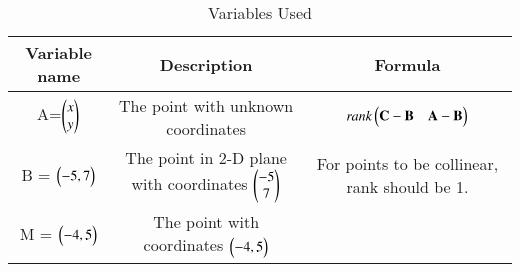 \begin{table}[!ht]
	\centering
	\setlength{\extrarowheight}{8pt}
	\begin{tabular}{|c|c|c|}
    \hline
    \textbf{Variable name} & \textbf{Description} & \textbf{Formula}\\ 
    \hline
		A=$\begin{pmatrix}x\\ y\end{pmatrix}$ & The point with unknown coordinates & $\emph{rank}\begin{pmatrix} \mathbf{C}-\mathbf{B} & \mathbf{A} - \mathbf{B} \end{pmatrix}$ \\
    \hline 
		B = $\begin{pmatrix}-5,7\end{pmatrix}$ & The point in 2-D plane with coordinates $\begin{pmatrix}-5 \\ 7\end{pmatrix}$ & For points to be collinear, rank should be 1. \\
    \hline
		M = $\begin{pmatrix}-4,5\end{pmatrix}$ & The point with coordinates $\begin{pmatrix}-4, 5\end{pmatrix}$ &  \\
    \hline   
    \end{tabular}
	\vspace{2mm}
	\caption{Variables Used}
	\label{table_1.7.10}
\end{table}

